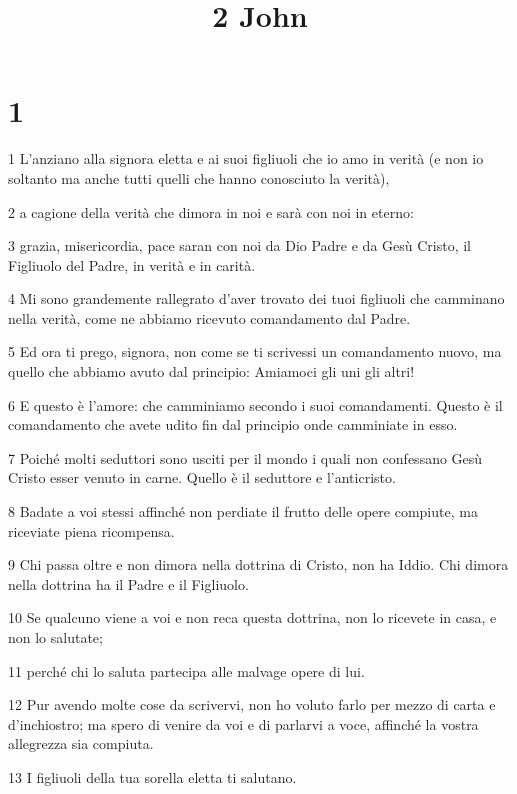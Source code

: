 

\title{2 John}


\chapter{1}

\par 1 L'anziano alla signora eletta e ai suoi figliuoli che io amo in verità (e non io soltanto ma anche tutti quelli che hanno conosciuto la verità),
\par 2 a cagione della verità che dimora in noi e sarà con noi in eterno:
\par 3 grazia, misericordia, pace saran con noi da Dio Padre e da Gesù Cristo, il Figliuolo del Padre, in verità e in carità.
\par 4 Mi sono grandemente rallegrato d'aver trovato dei tuoi figliuoli che camminano nella verità, come ne abbiamo ricevuto comandamento dal Padre.
\par 5 Ed ora ti prego, signora, non come se ti scrivessi un comandamento nuovo, ma quello che abbiamo avuto dal principio: Amiamoci gli uni gli altri!
\par 6 E questo è l'amore: che camminiamo secondo i suoi comandamenti. Questo è il comandamento che avete udito fin dal principio onde camminiate in esso.
\par 7 Poiché molti seduttori sono usciti per il mondo i quali non confessano Gesù Cristo esser venuto in carne. Quello è il seduttore e l'anticristo.
\par 8 Badate a voi stessi affinché non perdiate il frutto delle opere compiute, ma riceviate piena ricompensa.
\par 9 Chi passa oltre e non dimora nella dottrina di Cristo, non ha Iddio. Chi dimora nella dottrina ha il Padre e il Figliuolo.
\par 10 Se qualcuno viene a voi e non reca questa dottrina, non lo ricevete in casa, e non lo salutate;
\par 11 perché chi lo saluta partecipa alle malvage opere di lui.
\par 12 Pur avendo molte cose da scrivervi, non ho voluto farlo per mezzo di carta e d'inchiostro; ma spero di venire da voi e di parlarvi a voce, affinché la vostra allegrezza sia compiuta.
\par 13 I figliuoli della tua sorella eletta ti salutano.


